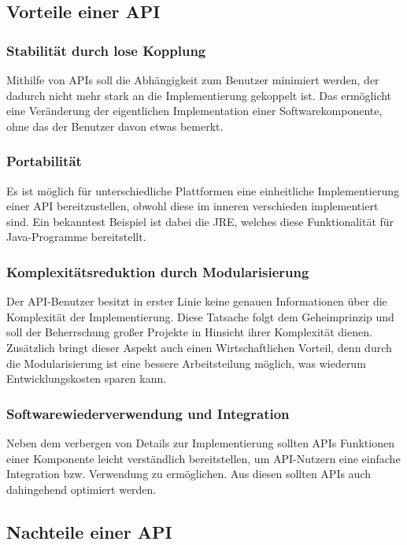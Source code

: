 \subsection{Vorteile einer \gls{API}}
\subsubsection{Stabilität durch lose Kopplung}
Mithilfe von \glspl{API} soll die Abhängigkeit zum Benutzer minimiert werden, der dadurch nicht mehr stark an die Implementierung gekoppelt ist. Das ermöglicht eine Veränderung der eigentlichen Implementation einer Softwarekomponente, ohne das der Benutzer davon etwas bemerkt.

\subsubsection{Portabilität}
Es ist möglich für unterschiedliche Plattformen eine einheitliche Implementierung einer \gls{API} bereitzustellen, obwohl diese im inneren verschieden implementiert sind. Ein bekanntest Beispiel ist dabei die \gls{JRE}, welches diese Funktionalität für Java-Programme bereitstellt.

\subsubsection{Komplexitätsreduktion durch Modularisierung}
Der \gls{API}-Benutzer besitzt in erster Linie keine genauen Informationen über die Komplexität der Implementierung. Diese Tatsache folgt dem Geheimprinzip und soll der Beherrschung großer Projekte in Hinsicht ihrer Komplexität dienen. Zusätzlich bringt dieser Aspekt auch einen Wirtschaftlichen Vorteil, denn durch die Modularisierung ist eine bessere Arbeitsteilung möglich, was wiederum Entwicklungskosten sparen kann.

\subsubsection{Softwarewiederverwendung und Integration}
Neben dem verbergen von Details zur Implementierung sollten \glspl{API} Funktionen einer Komponente leicht verständlich bereitstellen, um \gls{API}-Nutzern eine einfache Integration bzw. Verwendung zu ermöglichen. Aus diesen sollten \glspl{API} auch dahingehend optimiert werden.

\subsection{Nachteile einer \gls{API}}
